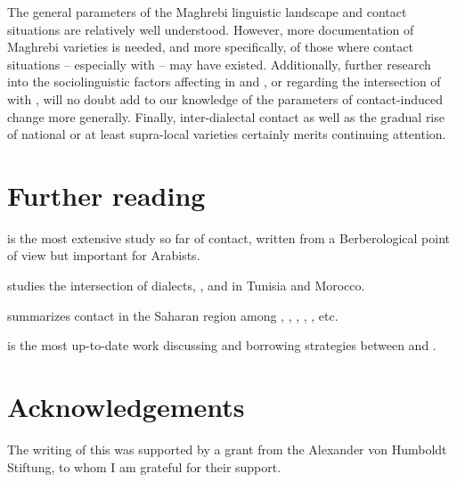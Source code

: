 \documentclass[output=paper]{langsci/langscibook}
\begin{document}
The general parameters of the Maghrebi linguistic landscape and contact situations are relatively well understood. However, more documentation of Maghrebi varieties is needed, and more specifically, of those where contact situations -- especially with  -- may have existed. Additionally, further research into the sociolinguistic factors affecting  in  and , or regarding the intersection of  with , will no doubt add to our knowledge of the parameters of contact-induced change more generally. Finally, inter-dialectal contact as well as the gradual rise of national or at least supra-local varieties certainly merits continuing attention.

\section*{Further reading}
\begin{furtherreading}
\item[\citet{Kossmann2013book}] is the most extensive study so far of \textendash {} contact, written from a Berberological point of view but important for Arabists.
\item[\citet{Sayahi2014}] studies the intersection of dialects,  ,  and  in Tunisia and Morocco.
\item[\citet{Souag2016sahara}] summarizes contact in the Saharan region among , , , , , etc.
\item[\citet{Ziamari2008}] is the most up-to-date work discussing  and borrowing strategies between   and .
\end{furtherreading}

\section*{Acknowledgements}
The writing of this  was supported by a grant from the Alexander von Humboldt Stiftung, to whom I am grateful for their support.
\end{document}
